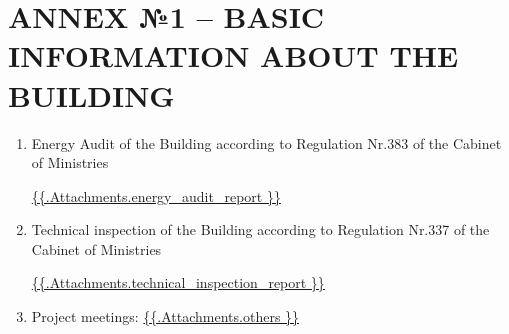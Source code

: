 \section{ANNEX №1 {–} BASIC INFORMATION ABOUT THE BUILDING}

\begin{enumerate}[label=\arabic*.]
	\item Energy Audit of the Building according to Regulation Nr.383 of the Cabinet of Ministries

\url{ {{.Attachments.energy_audit_report }} }

\iffalse attachment value="energy audit report" \fi

	\item Technical inspection of the Building according to Regulation Nr.337 of the Cabinet of Ministries

\url{ {{.Attachments.technical_inspection_report }} }

\iffalse attachment value="technical inspection report" \fi

	\item Project meetings:
          \url{ {{.Attachments.others }} }
          \iffalse attachment value="others" \fi

\end{enumerate}
